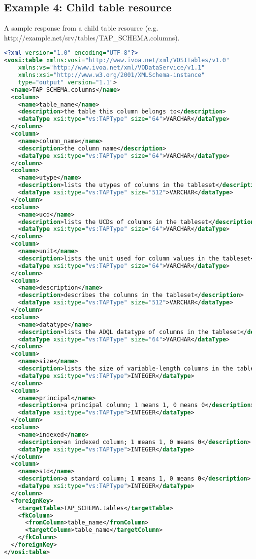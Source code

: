 \documentclass[11pt,letter]{ivoa}
\begin{document}
\subsection{Example 4: Child table resource}

A sample response from a child table resource (e.g.
http://example.net/srv/tables/TAP\_SCHEMA.columns).

\begin{lstlisting}[language=XML]
<?xml version="1.0" encoding="UTF-8"?>
<vosi:table xmlns:vosi="http://www.ivoa.net/xml/VOSITables/v1.0" 
    xmlns:vs="http://www.ivoa.net/xml/VODataService/v1.1" 
    xmlns:xsi="http://www.w3.org/2001/XMLSchema-instance"
    type="output" version="1.1">
  <name>TAP_SCHEMA.columns</name>
  <column>
    <name>table_name</name>
    <description>the table this column belongs to</description>
    <dataType xsi:type="vs:TAPType" size="64">VARCHAR</dataType>
  </column>
  <column>
    <name>column_name</name>
    <description>the column name</description>
    <dataType xsi:type="vs:TAPType" size="64">VARCHAR</dataType>
  </column>
  <column>
    <name>utype</name>
    <description>lists the utypes of columns in the tableset</description>
    <dataType xsi:type="vs:TAPType" size="512">VARCHAR</dataType>
  </column>
  <column>
    <name>ucd</name>
    <description>lists the UCDs of columns in the tableset</description>
    <dataType xsi:type="vs:TAPType" size="64">VARCHAR</dataType>
  </column>
  <column>
    <name>unit</name>
    <description>lists the unit used for column values in the tableset</description>
    <dataType xsi:type="vs:TAPType" size="64">VARCHAR</dataType>
  </column>
  <column>
    <name>description</name>
    <description>describes the columns in the tableset</description>
    <dataType xsi:type="vs:TAPType" size="512">VARCHAR</dataType>
  </column>
  <column>
    <name>datatype</name>
    <description>lists the ADQL datatype of columns in the tableset</description>
    <dataType xsi:type="vs:TAPType" size="64">VARCHAR</dataType>
  </column>
  <column>
    <name>size</name>
    <description>lists the size of variable-length columns in the tableset</description>
    <dataType xsi:type="vs:TAPType">INTEGER</dataType>
  </column>
  <column>
    <name>principal</name>
    <description>a principal column; 1 means 1, 0 means 0</description>
    <dataType xsi:type="vs:TAPType">INTEGER</dataType>
  </column>
  <column>
    <name>indexed</name>
    <description>an indexed column; 1 means 1, 0 means 0</description>
    <dataType xsi:type="vs:TAPType">INTEGER</dataType>
  </column>
  <column>
    <name>std</name>
    <description>a standard column; 1 means 1, 0 means 0</description>
    <dataType xsi:type="vs:TAPType">INTEGER</dataType>
  </column>
  <foreignKey>
    <targetTable>TAP_SCHEMA.tables</targetTable>
    <fkColumn>
      <fromColumn>table_name</fromColumn>
      <targetColumn>table_name</targetColumn>
    </fkColumn>
  </foreignKey>
</vosi:table>
\end{lstlisting}
\end{document}
